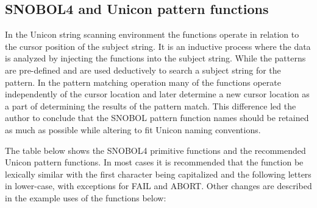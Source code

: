 \documentclass{article}
\begin{document}
\vspace{1 pc}
\subsection{SNOBOL4 and Unicon pattern functions}

In the Unicon string scanning environment the functions operate in relation to the cursor position of the subject string.  It is an inductive process where the data is analyzed by injecting the functions into the subject string.  While the patterns are pre-defined and are used deductively to search a subject string for the pattern.  In the pattern matching operation many of the functions operate independently of the cursor location and later determine a new cursor location as a part of determining the results of the pattern match.  This difference led the author to conclude that the SNOBOL pattern function names should be retained as much as possible while altering to fit Unicon naming conventions.  

The table below shows the SNOBOL4 primitive functions and the recommended Unicon pattern functions.  In most cases it is recommended that the function be lexically similar with the first character being capitalized and the following letters in lower-case, with exceptions for FAIL and ABORT.  Other changes are described in the example uses of the functions below: 
\end{document}
